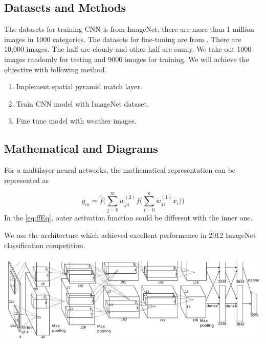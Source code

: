 \documentclass[a0,portrait]{a0poster}
\begin{document}
\begin{multicols}{2}
\section*{Datasets and Methods}

The datasets for training CNN is from ImageNet, there are more than 1 million images in 1000 categories. 
The datasets for fine-tuning are from \cite{lutwo}. There are 10,000 images. The half are cloudy and other half are sunny. We take out 1000 images randomly for testing and 9000 images for training.
We will achieve the objective with following method.
\begin{enumerate}
\item Implement spatial pyramid match layer.
\item Train CNN model with ImageNet dataset.
\item Fine tune model with weather images.
\end{enumerate}

\subsection*{Mathematical and Diagrams}

For a multilayer neural networks, the mathematical representation can be represented as

\begin{equation}\label{eq:ffEq}
y_{m} = \hat{f}\Big(\sum_{j=0}^{m}w_{j4}^{(2)}f\big(\sum_{i=0}^{n}w_{4i}^{(1)}x_{i}\big)\Big)
\end{equation}
In the \ref{eq:ffEq}, outer activation function could be different with the inner one.

We use the architecture which achieved excellent performance in 2012 ImageNet classification competition. 

\begin{center}\vspace{1cm}
\includegraphics[width=0.8\linewidth]{figures/AlexNet.png}
\end{center}\vspace{1cm}


\end{multicols}
\end{document}
